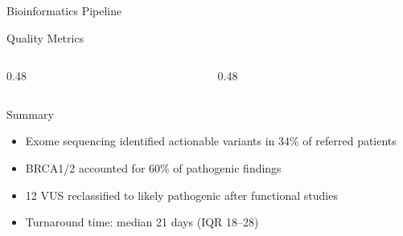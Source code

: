 \documentclass[palette=genome]{rossbeamergenomics}
\begin{document}
\begin{frame}{Bioinformatics Pipeline}
  \begin{pipelineflow}
    \pipelinearrow
    \pipelinearrow
    \pipelinearrow
    \pipelinearrow
  \end{pipelineflow}
\end{frame}

\begin{frame}{Quality Metrics}
  \begin{columns}[T]
    \begin{column}{0.48\textwidth}
    \end{column}
    \begin{column}{0.48\textwidth}
      \vskip8pt
      \vskip8pt
    \end{column}
  \end{columns}
\end{frame}

\begin{frame}{Summary}
  \begin{itemize}
    \item Exome sequencing identified actionable variants in 34\% of
          referred patients\cite{sharma2025}
    \item BRCA1/2 accounted for 60\% of pathogenic findings
    \item 12 VUS reclassified to likely pathogenic after functional studies
    \item Turnaround time: median 21 days (IQR 18--28)
  \end{itemize}
\end{frame}

\end{document}
